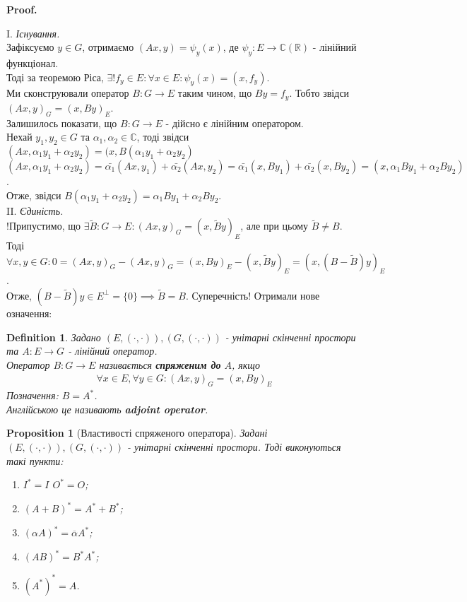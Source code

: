 \documentclass[a4paper, 10pt]{article}
\makeatletter
\theoremstyle{theoremdd}
\newtheorem{definition}[theorem]{Definition}
\newtheorem{proposition}[theorem]{Proposition}
\renewenvironment{proof}[1][Proof.\\]{\par
\pushQED{\hfill \qed}%
\normalfont \topsep6\p@\@plus6\p@\relax
\trivlist
\item\relax
{\bfseries
#1\@addpunct{.}}\hspace\labelsep\ignorespaces
}{%
\popQED\endtrivlist\@endpefalse
}
\makeatother
\begin{document}
\begin{proof}
I. \textit{Існування.}\\
Зафіксуємо $y \in G$, отримаємо $(Ax,y) = \psi_y(x)$, де $\psi_y \colon E \to \mathbb{C} (\mathbb{R})$ - лінійний функціонал.\\
Тоді за теоремою Ріса, $\exists! f_y \in E: \forall x \in E: \psi_y(x) = (x,f_y)$.\\
Ми сконструювали оператор $B \colon G \to E$ таким чином, що $By = f_y$. Тобто звідси $(Ax,y)_G = (x,By)_E$.\\
Залишилось показати, що $B \colon G \to E$ - дійсно є лінійним оператором.\\
Нехай $y_1,y_2 \in G$ та $\alpha_1,\alpha_2 \in \mathbb{C}$, тоді звідси\\
$(Ax,\alpha_1 y_1 + \alpha_2 y_2) = (x,B(\alpha_1 y_1 + \alpha_2 y_2)$\\
$(Ax,\alpha_1 y_1 + \alpha_2 y_2) = \bar{\alpha_1} (Ax,y_1) + \bar{\alpha_2} (Ax,y_2) = \bar{\alpha_1} (x,By_1) + \bar{\alpha_2} (x,By_2) = (x,\alpha_1 By_1 + \alpha_2 By_2)$.\\
Отже, звідси $B(\alpha_1 y_1 + \alpha_2 y_2) = \alpha_1 By_1 + \alpha_2 By_2$.
\bigskip \\
II. \textit{Єдиність.}\\
!Припустимо, що $\exists \tilde{B} \colon G \to E: (Ax,y)_G = (x,\tilde{B}y)_E$, але при цьому $\tilde{B} \neq B$. Тоді\\
$\forall x,y \in G: 0 = (Ax,y)_G - (Ax,y)_G = (x,By)_E - (x,\tilde{B}y)_E = (x,(B-\tilde{B})y)_E$.\\
Отже, $(B-\tilde{B})y \in E^\perp = \{0\} \implies \tilde{B} = B$. Суперечність!
\end{proof}
\noindent Отримали нове означення:

\begin{definition}
Задано $(E,(\cdot,\cdot)), (G,(\cdot,\cdot))$ - унітарні скінченні простори та $A \colon E \to G$ - лінійний оператор.\\
Оператор $B \colon G \to E$ називається \textbf{спряженим до} $A$, якщо
\begin{align*}
\forall x \in E, \forall y \in G: (Ax,y)_G = (x,By)_E
\end{align*}
Позначення: $B = A^*$.\\
Англійською це називають \textbf{adjoint operator}.
\end{definition}

\begin{proposition}[Властивості спряженого оператора]
Задані $(E,(\cdot,\cdot)), (G,(\cdot,\cdot))$ - унітарні скінченні простори. Тоді виконуються такі пункти:
\begin{enumerate}[nosep,wide=0pt,label={\arabic*)},start=0]
\item $I^* = I$ \qquad $O^* = O$;
\item $(A+B)^* = A^* + B^*$;
\item $(\alpha A)^* = \overline{\alpha} A^*$;
\item $(AB)^* = B^* A^*$;
\iffalse \item $(x,Ay) = (A^*x,y)$;\fi
\item $(A^*)^* = A$.
\end{enumerate}
\end{proposition}
\end{document}

